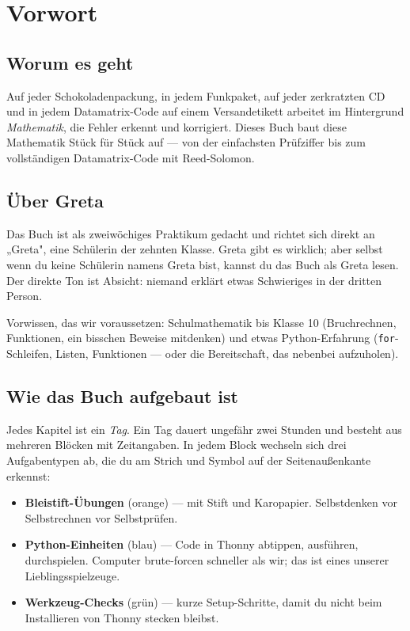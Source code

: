 \chapter*{Vorwort}

\section*{Worum es geht}

Auf jeder Schokoladenpackung, in jedem Funkpaket, auf jeder
zerkratzten CD und in jedem Datamatrix-Code auf einem Versandetikett
arbeitet im Hintergrund \emph{Mathematik}, die Fehler erkennt und
korrigiert. Dieses Buch baut diese Mathematik Stück für Stück auf —
von der einfachsten Prüfziffer bis zum vollständigen Datamatrix-Code
mit Reed-Solomon.

\section*{Über Greta}

Das Buch ist als zweiwöchiges Praktikum gedacht und richtet sich
direkt an „Greta", eine Schülerin der zehnten Klasse. Greta gibt es
wirklich; aber selbst wenn du keine Schülerin namens Greta bist, kannst
du das Buch als Greta lesen. Der direkte Ton ist Absicht: niemand
erklärt etwas Schwieriges in der dritten Person.

Vorwissen, das wir voraussetzen: Schulmathematik bis Klasse 10
(Bruchrechnen, Funktionen, ein bisschen Beweise mitdenken) und etwas
Python-Erfahrung (\texttt{for}-Schleifen, Listen, Funktionen — oder die
Bereitschaft, das nebenbei aufzuholen).

\section*{Wie das Buch aufgebaut ist}

Jedes Kapitel ist ein \emph{Tag}. Ein Tag dauert ungefähr zwei Stunden
und besteht aus mehreren Blöcken mit Zeitangaben. In jedem Block
wechseln sich drei Aufgabentypen ab, die du am Strich und Symbol auf
der Seitenaußenkante erkennst:

\begin{itemize}
\item \textcolor{cBleistift}{\textbf{Bleistift-Übungen}} (orange) — mit
  Stift und Karopapier. Selbstdenken vor Selbstrechnen vor Selbstprüfen.
\item \textcolor{cPython}{\textbf{Python-Einheiten}} (blau) — Code in
  Thonny abtippen, ausführen, durchspielen. Computer brute-forcen
  schneller als wir; das ist eines unserer Lieblingsspielzeuge.
\item \textcolor{cWerkzeug}{\textbf{Werkzeug-Checks}} (grün) — kurze
  Setup-Schritte, damit du nicht beim Installieren von Thonny stecken
  bleibst.
\end{itemize}

